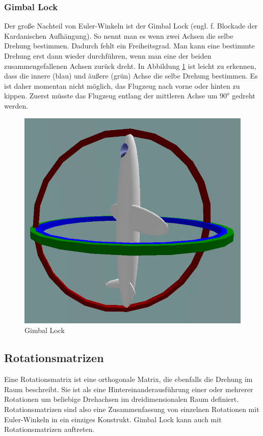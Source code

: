 \subsubsection{Gimbal Lock}
Der große Nachteil von Euler-Winkeln ist der Gimbal Lock (engl. f. Blockade der Kardanischen Aufhängung). So nennt man es wenn zwei Achsen die selbe Drehung bestimmen. Dadurch fehlt ein Freiheitsgrad. Man kann eine bestimmte Drehung erst dann wieder durchführen, wenn man eine der beiden zusammengefallenen Achsen zurück dreht. In Abbildung \ref{fig:gimbal-lock} ist leicht zu erkennen, dass die innere (blau) und äußere (grün) Achse die selbe Drehung bestimmen. Es ist daher momentan nicht möglich, das Flugzeug nach vorne oder hinten zu kippen. Zuerst müsste das Flugzeug entlang der mittleren Achse um $90^o$ gedreht werden. \cite{ wiki:002} \cite{paper:001}

\begin{figure}[htb]
\centering
\includegraphics[scale=0.4]{figures/gimbal-lock}
\caption{Gimbal Lock \cite{ wiki:004} }
\label{fig:gimbal-lock}
\end{figure}

\subsection{Rotationsmatrizen}
Eine Rotationsmatrix ist eine orthogonale Matrix, die ebenfalls die Drehung im Raum beschreibt. Sie ist als eine Hintereinanderausführung einer oder mehrerer Rotationen um beliebige Drehachsen im dreidimensionalen Raum definiert. Rotationsmatrizen sind also eine Zusammenfassung von einzelnen Rotationen mit Euler-Winkeln in ein einziges Konstrukt. Gimbal Lock kann auch mit Rotationsmatrizen auftreten. \cite{ wiki:003}

